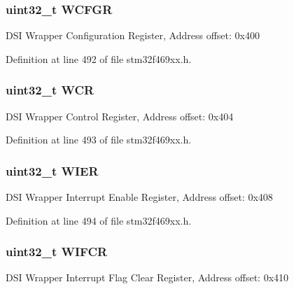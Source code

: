 \subsubsection[{\texorpdfstring{W\+C\+F\+GR}{WCFGR}}]{ uint32\+\_\+t W\+C\+F\+GR}\hypertarget{struct_d_s_i___type_def_a2f09c62b1fbeff179ab435e0cd07a2ba}{}\label{struct_d_s_i___type_def_a2f09c62b1fbeff179ab435e0cd07a2ba}
D\+SI Wrapper Configuration Register, Address offset\+: 0x400 

Definition at line 492 of file stm32f469xx.\+h.

\subsubsection[{\texorpdfstring{W\+CR}{WCR}}]{ uint32\+\_\+t W\+CR}\hypertarget{struct_d_s_i___type_def_a4ca8d4e372398db0e5045993ffa56b05}{}\label{struct_d_s_i___type_def_a4ca8d4e372398db0e5045993ffa56b05}
D\+SI Wrapper Control Register, Address offset\+: 0x404 

Definition at line 493 of file stm32f469xx.\+h.

\subsubsection[{\texorpdfstring{W\+I\+ER}{WIER}}]{ uint32\+\_\+t W\+I\+ER}\hypertarget{struct_d_s_i___type_def_abf251c3d39400d58da7eb5c8f8354160}{}\label{struct_d_s_i___type_def_abf251c3d39400d58da7eb5c8f8354160}
D\+SI Wrapper Interrupt Enable Register, Address offset\+: 0x408 

Definition at line 494 of file stm32f469xx.\+h.

\subsubsection[{\texorpdfstring{W\+I\+F\+CR}{WIFCR}}]{ uint32\+\_\+t W\+I\+F\+CR}\hypertarget{struct_d_s_i___type_def_a72700b16163185c01a76b121f2a260d4}{}\label{struct_d_s_i___type_def_a72700b16163185c01a76b121f2a260d4}
D\+SI Wrapper Interrupt Flag Clear Register, Address offset\+: 0x410 

